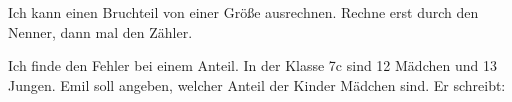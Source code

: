 \begin{aufgabe}{Ich kann einen Bruchteil von einer Größe ausrechnen. Rechne erst durch den Nenner, dann mal den Zähler.}
\end{aufgabe}

\begin{aufgabe}{Ich finde den Fehler bei einem Anteil. In der Klasse 7c sind 12 Mädchen und 13 Jungen. Emil soll angeben, welcher Anteil der Kinder Mädchen sind. Er schreibt:}
\end{aufgabe}
